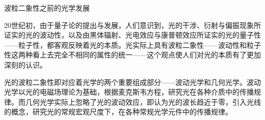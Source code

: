 
\begin{issues}
\issueTODO 波粒二象性之前的光学发展
\end{issues}

20世纪初，由于量子论的提出与发展，人们意识到，光的干涉、衍射与偏振现象所证实的光的波动性，以及由黑体辐射、光电效应与康普顿效应所证实的光的量子性——粒子性，都客观反映着光的本质。光实际上具有波粒二象性——波动性和粒子性这两种看上去完全不相同的属性的统一——这个观点使人们对光的本质有了更加深刻的认识。

光的波粒二象性即对应着光学的两个重要组成部分——波动光学和几何光学。波动光学以光的电磁场理论为基础，根据麦克斯韦方程，研究光在各种介质中的传播规律。而几何光学实际上忽略了光的波动效应，即认为光的波长趋近于零，引入光线的概念，研究光的常规宏观尺度下，在各种常规光学元件中的传播规律。
